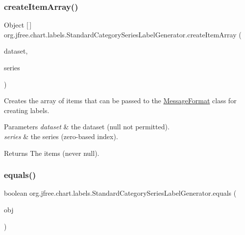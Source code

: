 \subsubsection{\texorpdfstring{create\+Item\+Array()}{createItemArray()}}
{\footnotesize\ttfamily Object \mbox{[}$\,$\mbox{]} org.\+jfree.\+chart.\+labels.\+Standard\+Category\+Series\+Label\+Generator.\+create\+Item\+Array (\begin{DoxyParamCaption}\item[{\mbox{\hyperlink{interfaceorg_1_1jfree_1_1data_1_1category_1_1_category_dataset}{Category\+Dataset}}}]{dataset,  }\item[{int}]{series }\end{DoxyParamCaption})\hspace{0.3cm}{\ttfamily [protected]}}

Creates the array of items that can be passed to the \mbox{\hyperlink{}{Message\+Format}} class for creating labels.


\begin{DoxyParams}{Parameters}
{\em dataset} & the dataset ({\ttfamily null} not permitted). \\
\hline
{\em series} & the series (zero-\/based index).\\
\hline
\end{DoxyParams}
\begin{DoxyReturn}{Returns}
The items (never {\ttfamily null}). 
\end{DoxyReturn}
\mbox{\label{classorg_1_1jfree_1_1chart_1_1labels_1_1_standard_category_series_label_generator_a534490b5ac89f669f93e425d6232fe97}} 
\subsubsection{\texorpdfstring{equals()}{equals()}}
{\footnotesize\ttfamily boolean org.\+jfree.\+chart.\+labels.\+Standard\+Category\+Series\+Label\+Generator.\+equals (\begin{DoxyParamCaption}\item[{Object}]{obj }\end{DoxyParamCaption})}

